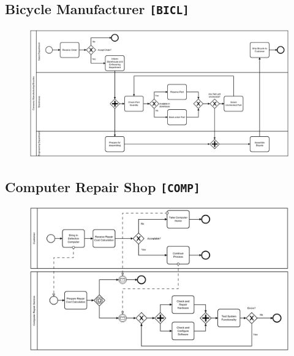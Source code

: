 \clearpage


\begin{landscape}
\thispagestyle{empty}
\section*{Bicycle Manufacturer \texttt{[BICL]}}
\begin{figure}[!h]
    \centering
    \includegraphics[width=1.3\textwidth]{figures/benchmark/Bicycle_Manufacturer.png}
\end{figure}
\end{landscape}

\clearpage


\begin{landscape}
\thispagestyle{empty}
\section*{Computer Repair Shop \texttt{[COMP]}}
\begin{figure}[!h]
    \centering
    \includegraphics[width=1.3\textwidth]{figures/benchmark/Computer_Repair.png}
\end{figure}
\end{landscape}

